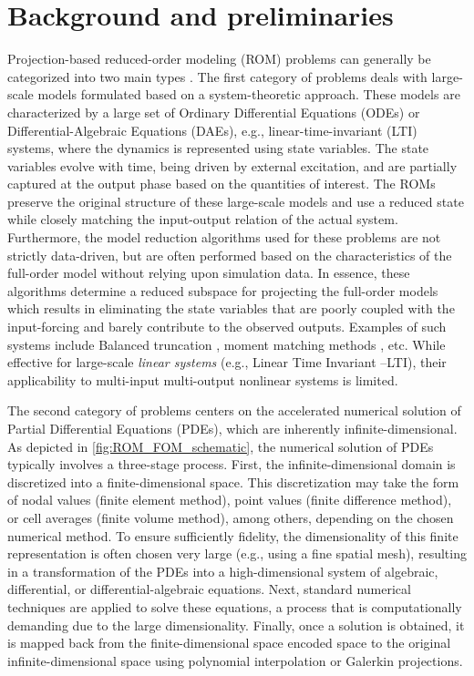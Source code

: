 \documentclass[11pt]{article}
\begin{document}
\section{Background and preliminaries}


Projection-based reduced-order modeling (ROM) problems can generally be categorized into two main types \cite{benner_2021}.
The first category of problems deals with large-scale models formulated based on a system-theoretic approach.
These models are characterized by a large set of Ordinary Differential Equations (ODEs) or Differential-Algebraic Equations (DAEs), e.g., linear-time-invariant (LTI) systems, where the dynamics is represented using state variables.
The state variables evolve with time, being driven by external excitation, and are partially captured at the output phase based on the quantities of interest.
The ROMs preserve the original structure of these large-scale models and use a reduced state while closely matching the input-output relation of the actual system.
Furthermore, the model reduction algorithms used for these problems are not strictly data-driven, but are often performed based on the characteristics of the full-order model without relying upon simulation data.
In essence, these algorithms determine a reduced subspace for projecting the full-order models which results in eliminating the state variables that are poorly coupled with the input-forcing and barely contribute to the observed outputs.
Examples of such systems include Balanced truncation \cite{moore2003principal}, moment matching methods \cite{benner2015survey,rowley2005model}, etc.
While effective for large-scale \textit{linear systems} (e.g., Linear Time Invariant --LTI), their applicability to multi-input multi-output nonlinear systems is limited.



The second category of problems centers on the accelerated numerical solution of Partial Differential Equations (PDEs), which are inherently infinite-dimensional.
As depicted in \cref{fig:ROM_FOM_schematic}, the numerical solution of PDEs typically involves a three-stage process.
First, the infinite-dimensional domain is discretized into a finite-dimensional space.
This discretization may take the form of nodal values (finite element method), point values (finite difference method), or cell averages (finite volume method), among others, depending on the chosen numerical method.
To ensure sufficiently fidelity, the dimensionality of this finite representation is often chosen very large (e.g., using a fine spatial mesh), resulting in a transformation of the PDEs into a high-dimensional system of algebraic, differential, or differential-algebraic equations.
Next, standard numerical techniques are applied to solve these equations, a process that is computationally demanding due to the large dimensionality.
Finally, once a solution is obtained, it is mapped back from the finite-dimensional space encoded space to the original infinite-dimensional space using polynomial interpolation or Galerkin projections.
\end{document}
